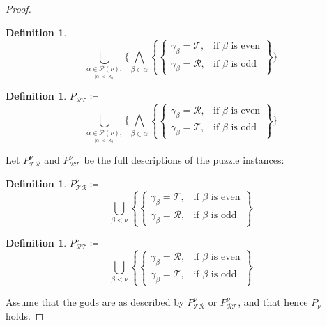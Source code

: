 \documentclass[twoside,twocolumn,a4paper,11pt]{article}
\theoremstyle{definition}
\newtheorem{defn}[theorem]{Definition}
\begin{document}
\begin{proof}
\begin{defn}
\begin{equation}
 \label{eq:PTR}
  \bigcup_{\underset{|\alpha|<\aleph_0}{\alpha\in\mathscr{P}(\nu),}}
   \{
      \bigwedge\limits_{\beta\in\alpha}
      \left\lbrace
       \begin{cases}
        \gamma_\beta\!=\!\mathcal{T},&\text{if } \beta \text{ is even}\\
        \gamma_\beta\!=\!\mathcal{R},&\text{if } \beta \text{ is odd}
       \end{cases}
      \right\rbrace
   \}
 \end{equation}
\end{defn}
\begin{defn}
\label{def:PRT}
$P_{\mathcal{\scriptscriptstyle R}\mathcal{\scriptscriptstyle T}} \coloneqq $
 \begin{equation}
 \label{eq:PRT}
  \bigcup_{\underset{|\alpha|<\aleph_0}{\alpha\in\mathscr{P}(\nu),}}
   \{
      \bigwedge\limits_{\beta\in\alpha}
      \left\lbrace
       \begin{cases}
        \gamma_\beta\!=\!\mathcal{R},&\text{if } \beta \text{ is even}\\
        \gamma_\beta\!=\!\mathcal{T},&\text{if } \beta \text{ is odd}
       \end{cases}
      \right\rbrace
   \}
 \end{equation}
\end{defn}
Let 
$P_{\mathcal{\scriptscriptstyle T}\mathcal{\scriptscriptstyle R}}^\nu$ and
$P_{\mathcal{\scriptscriptstyle R}\mathcal{\scriptscriptstyle T}}^\nu$ be the
full descriptions of the puzzle instances:
\begin{defn}
\label{def:PTRnu}
$P_{\mathcal{\scriptscriptstyle T}\mathcal{\scriptscriptstyle R}}^\nu \coloneqq $
 \begin{equation}
 \label{eq:PTRnu}
  \bigcup_{\beta<\nu}
      \left\lbrace
       \begin{cases}
        \gamma_\beta\!=\!\mathcal{T},&\text{if } \beta \text{ is even}\\
        \gamma_\beta\!=\!\mathcal{R},&\text{if } \beta \text{ is odd}
       \end{cases}
      \right\rbrace
 \end{equation}
\end{defn}
\begin{defn}
\label{def:PRTnu}
$P_{\mathcal{\scriptscriptstyle R}\mathcal{\scriptscriptstyle T}}^\nu \coloneqq $
 \begin{equation}
 \label{eq:PRTnu}
  \bigcup_{\beta<\nu}
      \left\lbrace
       \begin{cases}
        \gamma_\beta\!=\!\mathcal{R},&\text{if } \beta \text{ is even}\\
        \gamma_\beta\!=\!\mathcal{T},&\text{if } \beta \text{ is odd}
       \end{cases}
      \right\rbrace
 \end{equation}
\end{defn}
Assume that the gods are as described by 
$P_{\mathcal{\scriptscriptstyle T}\mathcal{\scriptscriptstyle R}}^\nu$ or
$P_{\mathcal{\scriptscriptstyle R}\mathcal{\scriptscriptstyle T}}^\nu$, and
that hence $P_\nu$ holds.


\end{proof}
\end{document}
